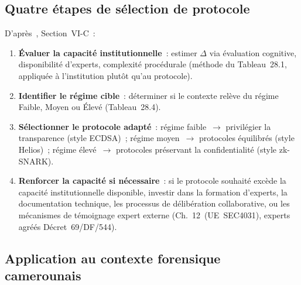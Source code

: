 \subsection{Quatre étapes de sélection de protocole}

D'après~\cite{minka2026conditional}, Section~VI-C~:

\begin{enumerate}
    \item \textbf{Évaluer la capacité institutionnelle}~: estimer
          $\Delta$ via évaluation cognitive, disponibilité d'experts,
          complexité procédurale (méthode du Tableau~28.1, appliquée
          à l'institution plutôt qu'au protocole).
    \item \textbf{Identifier le régime cible}~: déterminer si le
          contexte relève du régime Faible, Moyen ou Élevé
          (Tableau~28.4).
    \item \textbf{Sélectionner le protocole adapté}~: régime
          faible~$\to$ privilégier la transparence (style ECDSA)~;
          régime moyen~$\to$ protocoles équilibrés (style Helios)~;
          régime élevé~$\to$ protocoles préservant la confidentialité
          (style zk-SNARK).
    \item \textbf{Renforcer la capacité si nécessaire}~: si le
          protocole souhaité excède la capacité institutionnelle
          disponible, investir dans la formation d'experts, la
          documentation technique, les processus de délibération
          collaborative, ou les mécanismes de témoignage expert
          externe (Ch.~12~(UE~SEC4031), experts agréés
          Décret~69/DF/544).
\end{enumerate}

\subsection{Application au contexte forensique camerounais}

